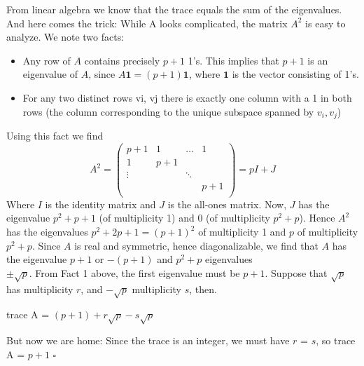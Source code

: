 \documentclass[10pt,twoside]{book}
\begin{document}
		From linear algebra we know that the trace equals the sum of the eigenvalues. And here comes the trick: While A looks complicated, the matrix $A^2$ is easy to analyze. We note two facts:\\
		\begin{itemize}
			\item{
			Any row of $A$ contains precisely $p+1$ 1's. This implies that $p+1$ is an  eigenvalue of $A$, since $A\mathbf{1} = (p+1)\mathbf{1}$, where $\mathbf{1}$ is the vector consisting  of 1's.}
			\item{
			 For any two distinct rows vi, vj there is exactly one column with a 1 in both rows (the column corresponding to the unique subspace spanned by $v_i, v_j$)}
		\end{itemize}
		Using this fact we find\\
		\[
		A^2 = \left(\begin{array}{cccc}
			p + 1 & 1 & \dots & 1 \\
			1 & p + 1 \\
			\vdots & & \ddots \\
			& & & p + 1 \\
		\end{array}\right)
		= pI + J
		\]
		Where $I$ is the identity matrix and $J$ is the all-ones matrix. Now, $J$ has the eigenvalue $p^2 + p + 1$ (of multiplicity 1) and 0 (of multiplicity $p^2 + p$). Hence $A^2$ has the eigenvalues $p^2+2p+1 = (p+1)^2$ of multiplicity 1 and $p$ of multiplicity $p^2+p$. Since $A$ is real and symmetric, hence diagonalizable, we find that $A$ has the eigenvalue $p + 1$ or $-(p + 1)$ and $p^2 + p$ eigenvalues\\ $\pm \sqrt{p}$. From Fact 1 above, the first eigenvalue must be $p + 1$. Suppose that $\sqrt{p}$ has multiplicity $r$, and $-\sqrt{p}$ multiplicity $s$, then.\\
		\begin{center}
			trace A = $(p+1) + r\sqrt{p} - s\sqrt{p} $
		\end{center}
		But now we are home: Since the trace is an integer, we must have $r$ = $s$, so trace A = $p + 1$ \hfill $\square$
\end{document}
